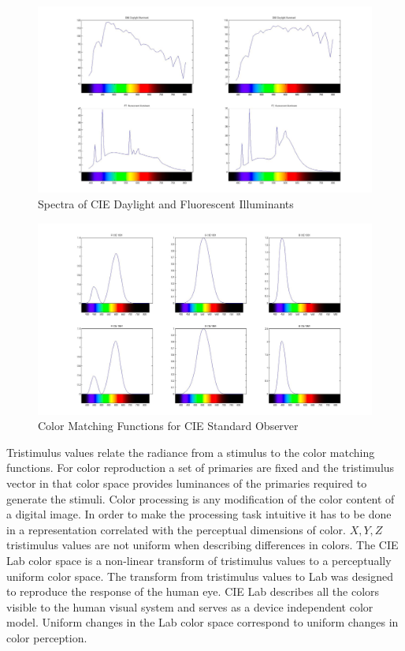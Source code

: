 \documentclass{amsart}
\theoremstyle{definition}
\theoremstyle{remark}
\numberwithin{equation}{section}
\begin{document}
\begin{figure}
  \caption{Spectra of CIE Daylight and Fluorescent Illuminants}
  \begin{center}
\includegraphics[width=12.0cm]{daylight_Flourcescent.jpg}
  \end{center}
\end{figure}

\begin{figure}
  \caption{Color Matching Functions for CIE Standard Observer}
  \begin{center}
\includegraphics[width=12.0cm]{XYZ_CMF.jpg}
  \end{center}
\end{figure}
Tristimulus values relate the radiance from a stimulus to the color matching functions.  For color reproduction a set of primaries are fixed and the  tristimulus vector in that color space provides luminances of the primaries required to generate the stimuli.  Color processing is any modification of the color content of a digital image. In order to make the processing task intuitive it has to be done in a representation correlated with the perceptual dimensions of color.  $X, Y, Z$ tristimulus values are not uniform when describing differences in colors.  The CIE Lab color space is a non-linear transform of tristimulus values to a perceptually uniform color space. The transform from tristimulus values to Lab was designed to reproduce the response of the human eye. CIE Lab describes all the colors visible to the human visual system and serves as a device independent color model.  Uniform changes in the Lab color space correspond to uniform changes in color perception.
\end{document}
